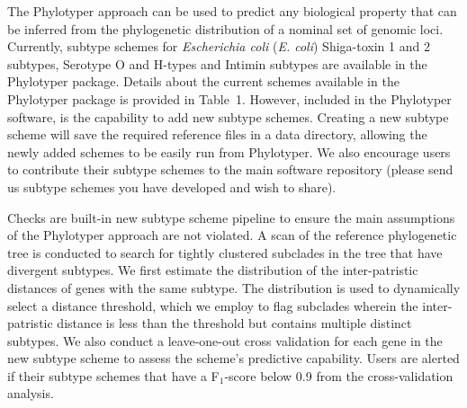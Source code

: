 \documentclass{bioinfo}
\begin{document}
The Phylotyper approach can be used to predict any biological property that can be inferred from the phylogenetic distribution of a nominal set of genomic loci.
Currently, subtype schemes for \emph{Escherichia coli} (\textit{E. coli}) Shiga-toxin 1 and 2 subtypes, Serotype O and H-types and Intimin subtypes are available in the Phylotyper package.
Details about the current schemes available in the Phylotyper package is provided in Table~1\vphantom{\ref{tab:01}}.
However, included in the Phylotyper software, is the capability to add new subtype schemes. 
Creating a new subtype scheme will save the required reference files in a data directory, allowing the newly added schemes to be easily run from Phylotyper. 
We also encourage users to contribute their subtype schemes to the main software repository (please send us subtype schemes you have developed and wish to share).

Checks are built-in new subtype scheme pipeline to ensure the main assumptions of the Phylotyper approach are not violated.  
A scan of the reference phylogenetic tree is conducted to search for tightly clustered subclades in the tree that have divergent subtypes.
We first estimate the distribution of the inter-patristic distances of genes with the same subtype.  
The distribution is used to dynamically select a distance threshold, which we employ to flag subclades wherein the inter-patristic distance is less than  the threshold but contains multiple distinct subtypes.
We also conduct a leave-one-out cross validation for each gene in the new subtype scheme to assess the scheme's predictive capability.
Users are alerted if their subtype schemes that have a F$_\text{1}$-score below 0.9 from the cross-validation analysis.
\end{document}
